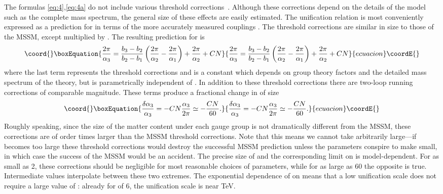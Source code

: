 \documentclass[a4paper,prl,twocolumn]{revtex4}
\begin{document}
The formulas \eqref{eq:4},\eqref{eq:4a} do not include various threshold
corrections~\cite{Hall:1981kf}. Although these corrections depend on
the details of the model such as the complete mass spectrum, the
general size of these effects are easily estimated. The unification
relation is most conveniently expressed as a prediction for \coordHE{}
in terms of the more accurately measured couplings \coordHE{}. The
threshold corrections are similar in size to those of the MSSM, except
multiplied by \coordHE{}. The resulting prediction for \coordHE{} is
\begin{equation}\coord{}\boxEquation{
  \label{eq:9}
  \frac{2\pi}{\alpha_3} = \frac{b_3 -b_2}{b_2-b_1}
  \left(\frac{2\pi}{\alpha_2}- \frac{2\pi}{\alpha_1}\right) +
  \frac{2\pi}{\alpha_2} + C N 
}{
  \frac{2\pi}{\alpha_3} = \frac{b_3 -b_2}{b_2-b_1}
  \left(\frac{2\pi}{\alpha_2}- \frac{2\pi}{\alpha_1}\right) +
  \frac{2\pi}{\alpha_2} + C N 
}{ecuacion}\coordE{}\end{equation}
where the last term \coordHE{} represents the threshold corrections and \coordHE{}
is a constant which depends on group theory factors and the detailed
mass spectrum of the theory, but is parametrically independent of \coordHE{}.
In addition to these threshold corrections there are two-loop running
corrections of comparable magnitude.  
These  terms produce a fractional change in \coordHE{} of
size
\begin{equation}\coord{}\boxEquation{
  \label{eq:10}
  \frac{\delta \alpha_3}{\alpha_3} = - C N \frac{\alpha_3}{2\pi}
  \simeq -\frac{C N}{60}.
}{
  \frac{\delta \alpha_3}{\alpha_3} = - C N \frac{\alpha_3}{2\pi}
  \simeq -\frac{C N}{60}.
}{ecuacion}\coordE{}\end{equation}
Roughly speaking, since the size of the matter content under each
gauge group is not dramatically different from the MSSM, these
corrections are of order \coordHE{} times larger than the MSSM threshold
corrections.  Note that this means we cannot take \coordHE{} arbitrarily
large---if \coordHE{} becomes too large these threshold corrections would
destroy the successful MSSM prediction unless the parameters conspire
to make \coordHE{} small, in which case the success of the MSSM would be an
accident.  The precise size of \coordHE{} and the corresponding limit on \coordHE{}
is model-dependent.  For \coordHE{} as small as 2, these corrections should
be negligible for most reasonable choices of parameters, while for \coordHE{}
as large as 60 the opposite is true.  Intermediate values interpolate
between these two extremes.  The exponential dependence of \coordHE{} on
\coordHE{} means that a low unification scale does not require a large
value of \coordHE{}: already for \coordHE{} of 6, the unification scale is near
\coordHE{} TeV.
\end{document}
